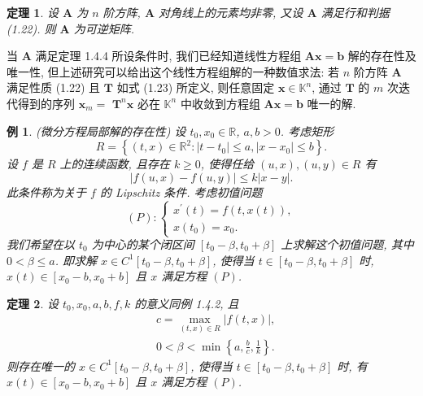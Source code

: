 \documentclass[openany]{ctexbook}
\theoremstyle{kaiti}
\newtheorem{theorem}{定理}[section]
\theoremstyle{normal}
\newtheorem{example}{例}[section]
\begin{document}
\begin{theorem}
  设 $\boldsymbol{A}$ 为 $n$ 阶方阵, $\boldsymbol{A}$ 对角线上的元素均非零, 又设 $\boldsymbol{A}$ 满足行和判据 (1.22). 则 $\boldsymbol{A}$ 为可逆矩阵.
\end{theorem}

当 $\boldsymbol{A}$ 满足定理 1.4.4 所设条件时, 我们已经知道线性方程组 $\boldsymbol{A} \boldsymbol{x}=\boldsymbol{b}$ 解的存在性及唯一性, 但上述研究可以给出这个线性方程组解的一种数值求法: 若 $n$ 阶方阵 $\boldsymbol{A}$ 满足性质 (1.22) 且 $\boldsymbol{T}$ 如式 (1.23) 所定义, 则任意固定 $\boldsymbol{x} \in \mathbb{K}^n$, 通过 $\boldsymbol{T}$ 的 $m$ 次迭代得到的序列 $\boldsymbol{x}_m=$ $\boldsymbol{T}^n \boldsymbol{x}$ 必在 $\mathbb{K}^n$ 中收敛到方程组 $\boldsymbol{A} \boldsymbol{x}=\boldsymbol{b}$ 唯一的解.

\begin{example}
(微分方程局部解的存在性) 设 $t_0, x_0 \in \mathbb{R}$, $a, b>0$. 考虑矩形
$$
R=\left\{(t, x) \in \mathbb{R}^2:\left|t-t_0\right| \leqslant a,\left|x-x_0\right| \leqslant b\right\}.
$$
设 $f$ 是 $R$ 上的连续函数, 且存在 $k \geqslant 0$, 使得任给 $(u, x),(u, y) \in R$ 有
\begin{equation}
  |f(u, x)-f(u, y)| \leqslant k|x-y|.
\end{equation}
此条件称为关于 $f$ 的 Lipschitz 条件. 考虑初值问题
$$
  (P):
  \begin{cases}
    x^{\prime}(t)=f(t, x(t)), \\
    x\left(t_0\right)=x_0.
  \end{cases}
$$
我们希望在以 $t_0$ 为中心的某个闭区间 $\left[t_0-\beta, t_0+\beta\right]$ 上求解这个初值问题, 其中 $0<\beta \leqslant a$. 即求解 $x \in C^1\left[t_0-\beta, t_0+\beta\right]$, 使得当 $t \in\left[t_0-\beta, t_0+\beta\right]$ 时, $x(t) \in\left[x_0-b, x_0+b\right]$ 且 $x$ 满足方程 $(P)$.
\end{example}

\begin{theorem}
设 $t_0, x_0, a, b, f, k$ 的意义同例 1.4.2, 且
$$
\begin{aligned}
&c=\max_{(t, x) \in R}|f(t, x)|, \\
&0<\beta<\min \left\{a, \frac{b}{c}, \frac{1}{k}\right\}.
\end{aligned}
$$
则存在唯一的 $x \in C^1[t_0-\beta, t_0+\beta]$, 使得当 $t \in[t_0-\beta, t_0+\beta]$ 时, 有 $x(t) \in[x_0-b, x_0+b]$ 且 $x$ 满足方程 $(P)$.
\end{theorem}
\end{document}

